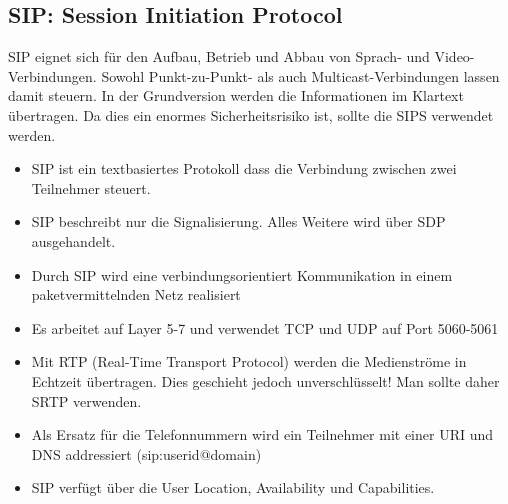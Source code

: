\subsection{SIP: Session Initiation Protocol}
SIP eignet sich für den Aufbau, Betrieb und Abbau von Sprach- und Video-Verbindungen. Sowohl Punkt-zu-Punkt- als auch Multicast-Verbindungen lassen damit steuern. In der Grundversion werden die Informationen im Klartext übertragen. Da dies ein enormes Sicherheitsrisiko ist, sollte die SIPS verwendet werden.

\begin{itemize}
	\item SIP ist ein textbasiertes Protokoll dass die Verbindung zwischen zwei Teilnehmer steuert.
	\item SIP beschreibt nur die Signalisierung. Alles Weitere wird über SDP ausgehandelt. 
	\item Durch SIP wird eine verbindungsorientiert Kommunikation in einem paketvermittelnden Netz realisiert
	\item Es arbeitet auf Layer 5-7 und verwendet TCP und UDP auf Port 5060-5061
	\item Mit RTP (Real-Time Transport Protocol)  werden die Medienströme in Echtzeit übertragen. Dies geschieht jedoch unverschlüsselt! Man sollte daher SRTP verwenden. 
	\item Als Ersatz für die Telefonnummern wird ein Teilnehmer mit einer URI und DNS addressiert (sip:userid@domain)
	\item SIP verfügt über die User Location, Availability und Capabilities. 
\end{itemize}

